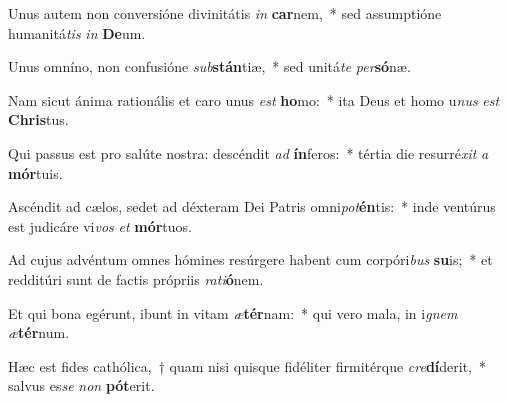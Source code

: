 \item Unus autem non conversióne divinitátis \textit{in} \textbf{car}nem,~* sed assumptióne humanitá\textit{tis} \textit{in} \textbf{De}um.
\item Unus omníno, non confusióne \textit{sub}\textbf{stán}tiæ,~* sed unitá\textit{te} \textit{per}\textbf{só}næ.
\item Nam sicut ánima rationális et caro unus \textit{est} \textbf{ho}mo:~* ita Deus et homo u\textit{nus} \textit{est} \textbf{Chris}tus.
\item Qui passus est pro salúte nostra: descéndit \textit{ad} \textbf{ín}feros:~* tértia die resurré\textit{xit} \textit{a} \textbf{mór}tuis.
\item Ascéndit ad cælos, sedet ad déxteram Dei Patris omni\textit{pot}\textbf{én}tis:~* inde ventúrus est judicáre vi\textit{vos} \textit{et} \textbf{mór}tuos.
\item Ad cujus advéntum omnes hómines resúrgere habent cum corpóri\textit{bus} \textbf{su}is;~* et redditúri sunt de factis própriis \textit{ra}\textit{ti}\textbf{ó}nem.
\item Et qui bona egérunt, ibunt in vitam \textit{æ}\textbf{tér}nam:~* qui vero mala, in i\textit{gnem} \textit{æ}\textbf{tér}num.
\item Hæc est fides cathólica,~† quam nisi quisque fidéliter firmitérque \textit{cre}\textbf{dí}derit,~* salvus es\textit{se} \textit{non} \textbf{pót}erit.
